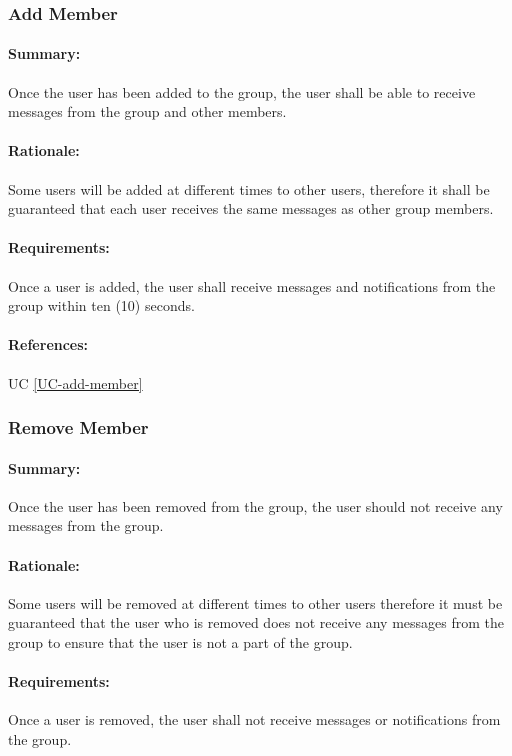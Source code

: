 \documentclass[11pt]{article}
\begin{document}
\subsubsection{Add Member} \label{FR-add-member}
\paragraph{Summary:}
Once the user has been added to the group, the user shall be able to receive messages from the group and other members.
\paragraph{Rationale:}
Some users will be added at different times to other users, therefore it shall be guaranteed that each user receives the same messages as other group members.
\paragraph{Requirements:}
Once a user is added, the user shall receive messages and notifications from the group within ten (10) seconds.
\paragraph{References:} UC \ref{UC-add-member}

\subsubsection{Remove Member} \label{FR-remove-member}
\paragraph{Summary:}
Once the user has been removed from the group, the user should not receive any messages from the group.
\paragraph{Rationale:}
Some users will be removed at different times to other users therefore it must be guaranteed that the user who is removed does not receive any messages from the group to ensure that the user is not a part of the group.
\paragraph{Requirements:}
Once a user is removed, the user shall not receive messages or notifications from the group.
\end{document}
